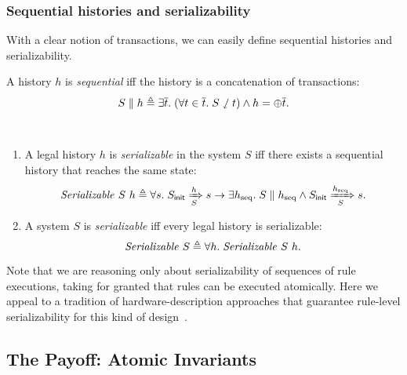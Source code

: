 \documentclass[sigplan,10pt,review,anonymous,screen]{acmart}\settopmatter{printfolios=true,printccs=false,printacmref=false}
\begin{document}
\subsubsection{Sequential histories and serializability}
With a clear notion of transactions, we can easily define sequential histories and serializability.

\begin{definition}
  A history $h$ is \emph{sequential} iff the history is a concatenation of
  transactions:
  \begin{displaymath}
    S \parallel h \triangleq \exists \overline{t}.\; (\forall t \in \overline{t}.\; S \sswarrow t) \wedge h = \oplus \overline{t}.
  \end{displaymath}
  \label{def-seq}
\end{definition}

\begin{definition}[Serializability]\mbox{}\\
  \begin{enumerate}[leftmargin=*]
  \item A legal history $h$ is \emph{serializable} in the system $S$ iff there
    exists a sequential history that reaches the same state:
    \begin{displaymath}
      \mathit{Serializable}\ S\ h \triangleq \forall s.\; S_{\textsf{init}} \xRightarrow[S]{h} s \to \exists h_{\textrm{seq}}.\; S \parallel h_{\textrm{seq}} \wedge S_{\textsf{init}} \xRightarrow[S]{h_{\textrm{seq}}} s.
    \end{displaymath}
  \item A system $S$ is \emph{serializable} iff every legal history is serializable:
    \begin{displaymath}
      \mathit{Serializable}\ S \triangleq \forall h.\; \mathit{Serializable}\ S\ h.
    \end{displaymath}
  \end{enumerate}
  \label{def-sz}
\end{definition}

Note that we are reasoning only about serializability of sequences of rule executions, taking for granted that rules can be executed atomically.
Here we appeal to a tradition of hardware-description approaches that guarantee rule-level serializability for this kind of design~\cite{fesi,kami,Murali:2015,Dave:2005,Dave:2007}.

\subsection{The Payoff: Atomic Invariants}
\label{sec-atomic-invariants}
\end{document}
